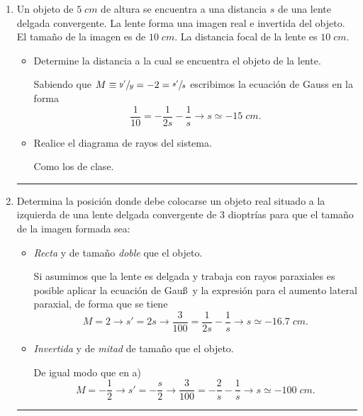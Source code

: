 \documentclass[a4paper,14pt]{exam}
\newcommand{\halmos}{\vspace*{-7mm}
	
					\begin{flushright}
						\rule{1mm}{2.5mm} 
					\end{flushright}\vspace*{-6mm}
						
					  }
\renewcommand{\qed}{\halmos}
\begin{document}
	
\vspace*{-2ex}

\vspace{3ex}

\begin{enumerate}
	
	
		\item   Un objeto de $5\;cm$ de altura se encuentra a una distancia $s$ de una lente delgada 
convergente. La lente forma una imagen real e invertida del objeto. El tamaño de la imagen es de
$10\;cm$. La distancia focal de la lente es $10\;cm$.
			\begin{itemize}
				\item[a)] Determine la distancia a la cual se encuentra el objeto de la lente.
				\begin{mdframed}[backgroundcolor=brown!10]  
				Sabiendo que $M\equiv \sfrac{y'}{y}=-2=\sfrac{s'}{s}$ escribimos la ecuación de Gauss en la forma 
				\[\frac{1}{10}=-\frac{1}{2s}-\frac{1}{s}\rightarrow s\simeq -15\;cm.\]
				\end{mdframed}
				\item[b)] Realice el diagrama de rayos del sistema.
				\begin{mdframed}[backgroundcolor=brown!10]  
				Como los de clase.
\end{mdframed}								
			\end{itemize}
			\qed
			
			
	\item Determina la posición donde debe colocarse un objeto real situado a la izquierda de una lente delgada convergente de $3$ dioptrías para que el tamaño de la imagen formada  sea:
						\begin{itemize}
				\item[a)] \textit{Recta} y de tamaño \textit{doble} que el objeto.
				
				\begin{mdframed}[backgroundcolor=brown!10] 
				Si asumimos que la lente es delgada y trabaja con rayos paraxiales es posible aplicar la ecuación de Gau\ss\, y la expresión para el aumento lateral paraxial, de forma que se tiene
				$$M=2\rightarrow s'=2s\rightarrow \frac{3}{100}=\frac{1}{2s}-\frac{1}{s}\rightarrow \boxed{s\simeq -16.7\;cm.}$$
				\end{mdframed}
				\item[b)] \textit{Invertida} y de \textit{mitad} de tamaño que el objeto.
				\begin{mdframed}[backgroundcolor=brown!10] 
				De igual modo que en a)
				$$M=-\frac{1}{2}\rightarrow s'=-\frac{s}{2}\rightarrow \frac{3}{100}=-\frac{2}{s}-\frac{1}{s}\rightarrow \boxed{s\simeq -100 \;cm.}$$
				\end{mdframed}
			\end{itemize}	
		\qed
	

\end{enumerate}
\end{document}
